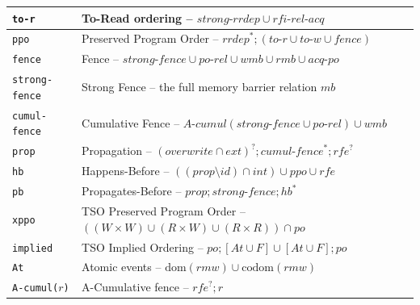 \begin{longtable}{p{2.5cm}p{8cm}}
    \midrule
    \texttt{to-r}             & To-Read ordering -- $\mathit{strong\text{-}rrdep} \cup \mathit{rfi\text{-}rel\text{-}acq}$ \\
    \midrule
    \texttt{ppo}                     & Preserved Program Order -- $\mathit{rrdep}^{*} \mathbin{;} (\mathit{to\text{-}r} \cup \mathit{to\text{-}w} \cup \mathit{fence})$ \\
    \midrule
    \texttt{fence}                   & Fence -- $\mathit{strong\text{-}fence} \cup \mathit{po\text{-}rel} \cup \mathit{wmb} \cup \mathit{rmb} \cup \mathit{acq\text{-}po}$ \\
    \midrule
    \texttt{strong-fence}     & Strong Fence -- the full memory barrier relation $\mathit{mb}$ \\
    \midrule
    \texttt{cumul-fence}      & Cumulative Fence -- $A\text{-}cumul(\mathit{strong\text{-}fence} \cup \mathit{po\text{-}rel}) \cup \mathit{wmb}$ \\
    \midrule
    \texttt{prop}                    & Propagation -- $(\mathit{overwrite} \cap \mathit{ext})^{?} \mathbin{;} \mathit{cumul\text{-}fence}^{*} \mathbin{;} \mathit{rfe}^{?}$ \\
    \midrule
    \texttt{hb}                      & Happens-Before -- $((\mathit{prop} \setminus \mathit{id}) \cap \mathit{int}) \cup \mathit{ppo} \cup \mathit{rfe}$ \\
    \midrule
    \texttt{pb}                      & Propagates-Before -- $\mathit{prop} \mathbin{;} \mathit{strong\text{-}fence} \mathbin{;} \mathit{hb}^{*}$ \\
    \midrule
    \texttt{xppo}                    & TSO Preserved Program Order -- $((W \times W) \cup (R \times W) \cup (R \times R)) \cap \mathit{po}$ \\
    \midrule
    \texttt{implied}                 & TSO Implied Ordering -- $\mathit{po} \mathbin{;} [\mathit{At} \cup F] \cup [\mathit{At} \cup F] \mathbin{;} \mathit{po}$ \\
    \midrule
    \texttt{At}                      & Atomic events -- $\mathrm{dom}(\mathit{rmw}) \cup \mathrm{codom}(\mathit{rmw})$ \\
    \midrule
    \texttt{A-cumul($r$)}       & A-Cumulative fence -- $\mathit{rfe}^{?} \mathbin{;} r$ \\
    \bottomrule
\end{longtable}

